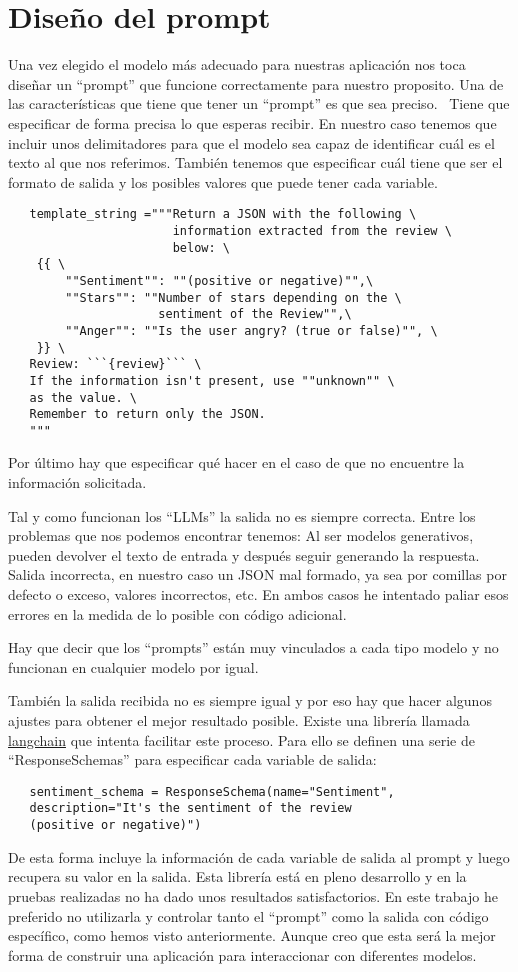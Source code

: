 \section{Diseño del prompt}
Una vez elegido el modelo más adecuado para nuestras aplicación nos toca diseñar un ``prompt'' 
que funcione correctamente para nuestro proposito.
Una de las características que tiene que tener un ``prompt'' es que sea preciso.~\cite{white2023prompt}
Tiene que especificar de forma precisa lo que esperas recibir.
En nuestro caso tenemos que incluir unos delimitadores para que el modelo sea capaz de identificar 
cuál es el texto al que nos referimos.
También tenemos que especificar cuál tiene que ser el formato de salida y los posibles 
valores que puede tener cada variable.
\begin{verbatim}
   template_string ="""Return a JSON with the following \
                       information extracted from the review \
                       below: \
    {{ \
        ""Sentiment"": ""(positive or negative)"",\
        ""Stars"": ""Number of stars depending on the \
                     sentiment of the Review"",\
        ""Anger"": ""Is the user angry? (true or false)"", \
    }} \
   Review: ```{review}``` \
   If the information isn't present, use ""unknown"" \
   as the value. \
   Remember to return only the JSON. 
   """
\end{verbatim}
Por último hay que especificar qué hacer en el caso de que 
no encuentre la información solicitada.

Tal y como funcionan los ``LLMs'' la salida no es siempre correcta. 
Entre los problemas que nos podemos encontrar tenemos:
   Al ser modelos generativos, pueden devolver el texto de entrada y después seguir generando la respuesta.
   Salida incorrecta, en nuestro caso un JSON mal formado, ya sea por comillas por defecto o exceso, valores incorrectos, etc.
En ambos casos he intentado paliar esos errores en la medida de lo posible con código adicional.

Hay que decir que los ``prompts'' están muy vinculados a cada tipo 
modelo y no funcionan en cualquier modelo por igual.

También la salida recibida no es siempre igual y por eso hay que hacer
algunos ajustes para obtener el mejor resultado posible.
Existe una librería llamada \href{https://python.langchain.com/docs/get_started/introduction}{langchain} que intenta facilitar este proceso.
Para ello se definen una serie de ``ResponseSchemas'' para especificar cada variable de salida:
\begin{verbatim}
   sentiment_schema = ResponseSchema(name="Sentiment",
   description="It's the sentiment of the review 
   (positive or negative)") 
\end{verbatim}
De esta forma incluye la información de cada variable de salida al prompt y luego recupera su valor en la salida.
Esta librería está en pleno desarrollo y en la pruebas realizadas no ha dado unos resultados satisfactorios.
En este trabajo he preferido no utilizarla y controlar tanto el ``prompt'' como la salida con código específico, como hemos visto anteriormente.  
Aunque creo que esta será la mejor forma de construir una aplicación para interaccionar con diferentes modelos.
\newpage

